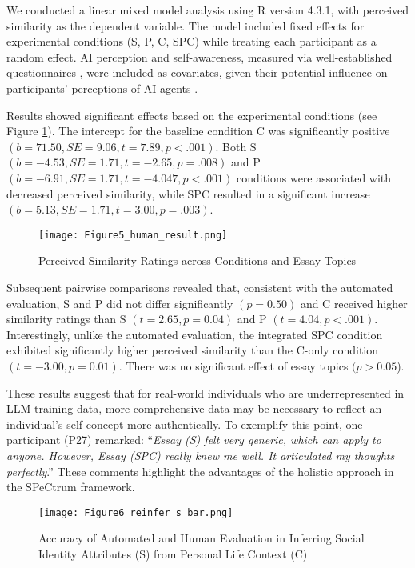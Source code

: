 We conducted a linear mixed model analysis using R version 4.3.1, with perceived similarity as the dependent variable. The model included fixed effects for experimental conditions (S, P, C, SPC) while treating each participant as a random effect. AI perception and self-awareness, measured via well-established questionnaires \citep{naeimi2019validating, wang2023measuring, sindermann2021assessing}, were included as covariates, given their potential influence on participants' perceptions of AI agents \citep{jiang-etal-2024-personallm, kross2017self}.

Results showed significant effects based on the experimental conditions (see Figure \ref{fig:5}). The intercept for the baseline condition C was significantly positive $(b = 71.50, \mathit{SE} = 9.06, t = 7.89, p < .001)$. Both S $(b = -4.53, \mathit{SE} = 1.71, t = -2.65, p = .008)$ and P $(b = -6.91, \mathit{SE} = 1.71, t = -4.047, p < .001)$ conditions were associated with decreased perceived similarity, while SPC resulted in a significant increase $(b = 5.13, \mathit{SE} = 1.71, t = 3.00, p = .003)$.

\begin{figure}
    \centering
    \texttt{[image: Figure5\_human\_result.png]}
    \caption{Perceived Similarity Ratings across Conditions and Essay Topics}
    \label{fig:5}
\end{figure}

Subsequent pairwise comparisons revealed that, consistent with the automated evaluation, S and P did not differ significantly $(p = 0.50)$ and C received higher similarity ratings than S $(t = 2.65, p = 0.04)$ and P $(t = 4.04, p < .001)$. Interestingly, unlike the automated evaluation, the integrated SPC condition exhibited significantly higher perceived similarity than the C-only condition $(t = -3.00, p = 0.01)$. There was no significant effect of essay topics $(p > 0.05$).

These results suggest that for real-world individuals who are underrepresented in LLM training data, more comprehensive data may be necessary to reflect an individual’s self-concept more authentically. To exemplify this point, one participant (P27) remarked:
``\textit{Essay (S) felt very generic, which can apply to anyone. However, Essay (SPC) really knew me well. It articulated my thoughts perfectly}.''
These comments highlight the advantages of the holistic approach in the SPeCtrum framework.


\begin{figure}
    \centering
    \texttt{[image: Figure6\_reinfer\_s\_bar.png]}
    \caption{Accuracy of Automated and Human Evaluation in Inferring Social Identity Attributes (S) from Personal Life Context (C)}
    \label{fig:6}
\end{figure}


